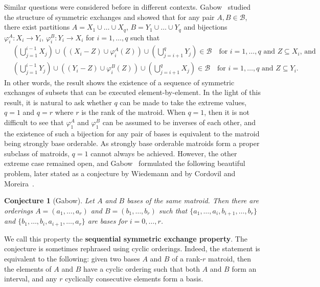 \documentclass[11pt,a4paper]{article}
\theoremstyle{plain}
\newtheorem{conj}[thm]{Conjecture}
\theoremstyle{definition}
\newcommand{\cB}{\mathcal{B}}
\begin{document}
Similar questions were considered before in different contexts. Gabow~\cite{gabow1976decomposing} studied the structure of symmetric exchanges and showed that for any pair $A,B\in\cB$, there exist partitions $A=X_1\cup\dots\cup X_q$, $B=Y_1\cup\dots\cup Y_q$ and bijections $\varphi^A_i\colon X_i\to Y_i$, $\varphi^B_i\colon Y_i\to X_i$ for $i=1,\dots,q$ such that 
\begin{eqnarray*}
&\left(\bigcup_{j=1}^{i-1}X_j\right)\cup \left((X_i-Z)\cup \varphi^A_i(Z)\right)\cup\left(\bigcup_{j=i+1}^q Y_{j}\right)\in\cB\quad\text{for $i=1,\dots,q$ and $Z\subseteq X_i$, and}&\\
&\left(\bigcup_{j=1}^{i-1}Y_j\right)\cup \left((Y_i-Z)\cup \varphi^B_i(Z)\right)\cup\left(\bigcup_{j=i+1}^q X_{j}\right)\in\cB\quad\text{for $i=1,\dots,q$ and $Z\subseteq Y_i$.}&
\end{eqnarray*}
In other words, the result shows the existence of a sequence of symmetric exchanges of subsets that can be executed element-by-element. In the light of this result, it is natural to ask whether $q$ can be made to take the extreme values, $q=1$ and $q=r$ where $r$ is the rank of the matroid. When $q=1$, then it is not difficult to see that $\varphi^A_1$ and $\varphi^B_1$ can be assumed to be inverses of each other, and the existence of such a bijection for any pair of bases is equivalent to the matroid being strongly base orderable. As strongly base orderable matroids form a proper subclass of matroids, $q=1$ cannot always be achieved. However, the other extreme case remained open, and Gabow~\cite{gabow1976decomposing} formulated the following beautiful problem, later stated as a conjecture by Wiedemann \cite{wiedemann1984cyclic} and by Cordovil and Moreira~\cite{cordovil1993bases}.

\begin{conj}[Gabow] \label{conj:gabow}
Let $A$ and $B$ bases of the same matroid. Then there are orderings $A=(a_1,\dots,a_r)$ and $B=(b_1,\dots,b_r)$ such that $\{a_1,\dots,a_i,b_{i+1},\dots,b_r\}$ and $\{b_1,\dots,b_i,a_{i+1},\dots,a_r\}$ are bases for $i=0,\dots,r$.
\end{conj}

We call this property the \textbf{sequential symmetric exchange property}. The conjecture is sometimes rephrased using cyclic orderings. Indeed, the statement is equivalent to the following: given two bases $A$ and $B$ of a rank-$r$ matroid, then the elements of $A$ and $B$ have a cyclic ordering such that both $A$ and $B$ form an interval, and any $r$ cyclically consecutive elements form a basis. 
\end{document}
